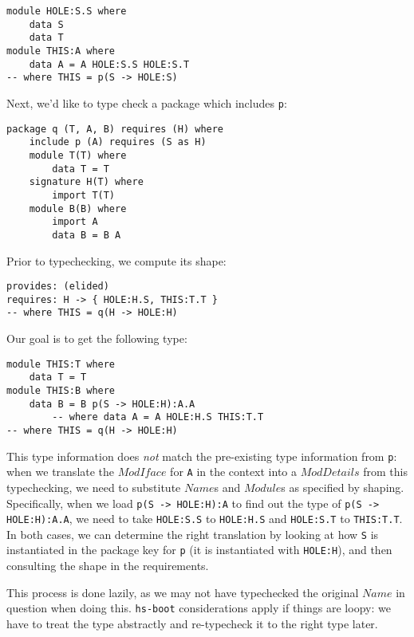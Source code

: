 \documentclass{article}
\newcommand{\I}[1]{\ensuremath{\mathit{#1}}}
\begin{document}
\begin{verbatim}
module HOLE:S.S where
    data S
    data T
module THIS:A where
    data A = A HOLE:S.S HOLE:S.T
-- where THIS = p(S -> HOLE:S)
\end{verbatim}

Next, we'd like to type check a package which includes \verb|p|:

\begin{verbatim}
package q (T, A, B) requires (H) where
    include p (A) requires (S as H)
    module T(T) where
        data T = T
    signature H(T) where
        import T(T)
    module B(B) where
        import A
        data B = B A
\end{verbatim}


Prior to typechecking, we compute its shape:

\begin{verbatim}
provides: (elided)
requires: H -> { HOLE:H.S, THIS:T.T }
-- where THIS = q(H -> HOLE:H)
\end{verbatim}

Our goal is to get the following type:

\begin{verbatim}
module THIS:T where
    data T = T
module THIS:B where
    data B = B p(S -> HOLE:H):A.A
        -- where data A = A HOLE:H.S THIS:T.T
-- where THIS = q(H -> HOLE:H)
\end{verbatim}

This type information does \emph{not} match the pre-existing
type information from \verb|p|: when we translate the \I{ModIface} for
\verb|A| in the context into a \I{ModDetails} from this typechecking,
we need to substitute \I{Name}s and \I{Module}s
as specified by shaping.  Specifically, when we load \verb|p(S -> HOLE:H):A|
to find out the type of \verb|p(S -> HOLE:H):A.A|,
we need to take \verb|HOLE:S.S| to \verb|HOLE:H.S| and \verb|HOLE:S.T| to \verb|THIS:T.T|.
In both cases, we can determine the right translation by looking at how \verb|S| is
instantiated in the package key for \verb|p| (it is instantiated with \verb|HOLE:H|),
and then consulting the shape in the requirements.

This process is done lazily, as we may not have typechecked the original
\I{Name} in question when doing this.  \verb|hs-boot| considerations apply
if things are loopy: we have to treat the type abstractly and re-typecheck it
to the right type later.
\end{document}
